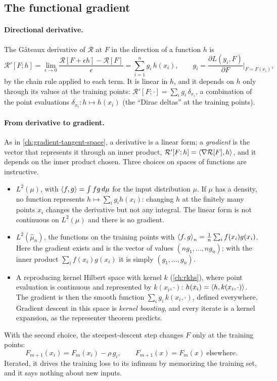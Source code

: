 \begin{notechapter}
\section{The functional gradient}\label{gradient-boosting:sec:functional}

\paragraph{Directional derivative.} The Gâteaux derivative of $\mathcal R$ at $F$ in the direction of a
function $h$ is
\[
  \mathcal R'[F; h] = \lim_{\epsilon\to0}\frac{\mathcal R[F + \epsilon h] - \mathcal R[F]}\epsilon = \sum_{i=1}^ng_i\,h(x_i),\qquad
  g_i = \frac{\partial L(y_i, F)}{\partial F}\Big|_{F = F(x_i)},
\]
by the chain rule applied to each term. It is linear in $h$, and it depends on $h$ only through
its values at the training points: $\mathcal R'[F;\cdot] = \sum_ig_i\,\delta_{x_i}$, a combination of the point
evaluations $\delta_{x_i}: h\mapsto h(x_i)$ (the ``Dirac deltas'' at the training points).

\paragraph{From derivative to gradient.} As in \cref{ch:gradient-tangent-space}, a derivative
is a linear form; a \emph{gradient} is the vector that represents it through an inner
product, $\mathcal R'[F; h] = \left\langle \nabla\mathcal R[F], h \right\rangle$, and it depends on the inner product chosen. Three
choices on spaces of functions are instructive.
\begin{itemize}
  \item $L^2(\mu)$, with $\left\langle f, g \right\rangle = \int fg\,d\mu$ for the input distribution $\mu$. If $\mu$ has a density, no function
        represents $h\mapsto\sum_ig_ih(x_i)$: changing $h$ at the finitely many points $x_i$ changes the
        derivative but not any integral. The linear form is not continuous on $L^2(\mu)$ and there
        is no gradient.
  \item $L^2(\hat\mu_n)$, the functions on the training points with $\left\langle f, g \right\rangle_n = \frac1n\sum_if(x_i)g(x_i)$. Here
        the gradient exists and is the vector of values $(ng_1,\dots,ng_n)$; with the inner product
        $\sum_if(x_i)g(x_i)$ it is simply $(g_1,\dots,g_n)$.
  \item A reproducing kernel Hilbert space with kernel $k$ (\cref{ch:rkhs}), where point evaluation is
        continuous and represented by $k(x_i,\cdot)$: $h(x_i) = \left\langle h, k(x_i,\cdot) \right\rangle$. The gradient is then the smooth
        function $\sum_ig_i\,k(x_i,\cdot)$, defined everywhere. Gradient descent in this space is
        \emph{kernel boosting}, and every iterate is a kernel expansion, as the representer
        theorem predicts.
\end{itemize}
With the second choice, the steepest-descent step changes $F$ only at the training points:
\[
  F_{m+1}(x_i) = F_m(x_i) - \rho\,g_i,\qquad F_{m+1}(x) = F_m(x)\ \text{elsewhere}.
\]
Iterated, it drives the training loss to its infimum by memorizing the training set, and
it says nothing about new inputs.


\end{notechapter}
